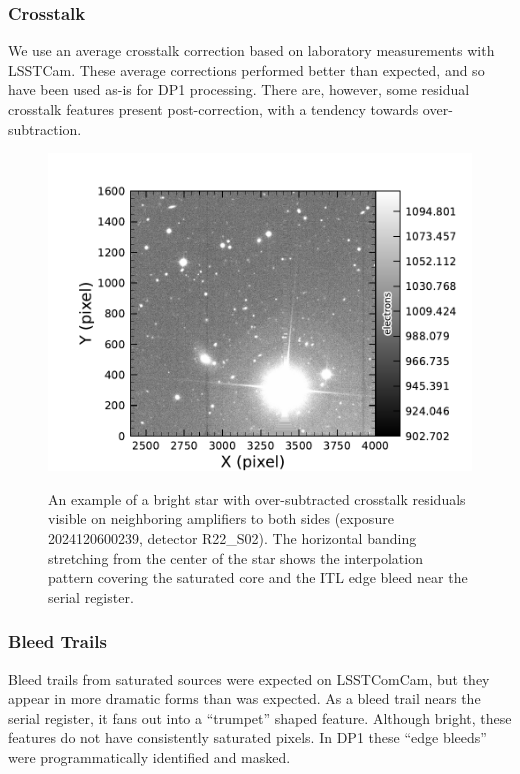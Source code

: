 \subsubsection{Crosstalk}
We use an average crosstalk correction based on laboratory measurements with LSSTCam.
These average corrections performed better than expected, and so have been used as-is for DP1 processing.
There are, however, some residual crosstalk features present post-correction, with a tendency towards over-subtraction.
\begin{figure}[htb!]
  \centering
  \includegraphics[width=0.98\linewidth]{figures/dp1_isr_anomalies-crosstalk_residual.pdf}
  \label{fig:crosstalk_residual}
  \caption{
    An example of a bright star with over-subtracted crosstalk residuals visible on neighboring amplifiers to both sides (exposure 2024120600239, detector R22\_S02).
    The horizontal banding stretching from the center of the star shows the interpolation pattern covering the saturated core and the ITL edge bleed near the serial register.
  }
\end{figure}

\subsubsection{Bleed Trails}
Bleed trails from saturated sources were expected on LSSTComCam, but they appear in more dramatic forms than was expected.
As a bleed trail nears the serial register, it fans out into a ``trumpet'' shaped feature.
Although bright, these features do not have consistently saturated pixels.
In DP1 these ``edge bleeds'' were programmatically identified and masked.

